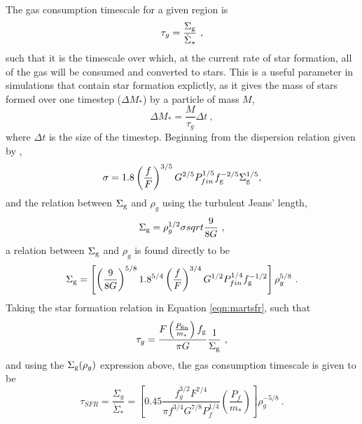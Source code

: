 The gas consumption timescale for a given region is
\begin{equation}
\label{eqn:gcdef}
\tau_g = \frac{\Sigma_\mathrm{g}}{\dot{\Sigma}_*}~,
\end{equation}
such that it is the timescale over which, at the current rate of star formation, all of the gas will be consumed and converted to stars.
This is a useful parameter in simulations that contain star formation explictly, as it gives the mass of stars formed over one timestep ($\Delta M_*$) by a particle of mass $M$,
$$
\Delta M_* = \frac{M}{\tau_g} \Delta t~,
$$
where $\Delta t$ is the size of the timestep. Beginning from the dispersion relation given by \citet{martizzi_supernova_2015},
$$
\sigma = 1.8 \left(\frac{f}{F}\right)^{{3/5}} G^{{2/5}} P_{fin}^{{1/5}} f_\mathrm{g}^{{-2/5}} \Sigma_\mathrm{g}^{{1/5}},
$$
and the relation between $\Sigma_\mathrm{g}$ and $\rho_g$ using the turbulent Jeans' length,
$$
\Sigma_\mathrm{g} = \rho_g^{1/2} \sigma sqrt{\frac{9}{8G}}~,
$$
a relation between $\Sigma_\mathrm{g}$ and $\rho_g$ is found directly to be
\begin{equation}
\label{eqn:sgrhog}
\Sigma_\mathrm{g} = \left[\left(\frac{9}{8G}\right)^{5/8} 1.8^{5/4} \left(\frac{f}{F}\right)^{3/4} G^{1/2} P_{fin}^{1/4} f_\mathrm{g}^{-1/2}\right] \rho_g^{5/8} ~.
\end{equation}
Taking the star formation relation in Equation \ref{eqn:martsfr}, such that
$$
\tau_g = \frac{F\left(\frac{P_\mathrm{fin}}{m_*}\right)f_\mathrm{g}}{\pi G} \frac{1}{\Sigma_\mathrm{g}}~,
$$
and using the $\Sigma_\mathrm{g} ( \rho_g )$ expression above, the gas consumption timescale is given to be
\begin{equation}
\label{eqn:gc}
\tau_{SFR} = \frac{\Sigma_g}{\dot{\Sigma}_*} = \left[0.45 \frac{f_g^{3/2} F^{7/4}}{\pi f^{3/4} G^{7/8} P_f^{1/4}} \left(\frac{P_{f}}{m_*}\right)\right] \rho_g^{-5/8}~.
\end{equation}




